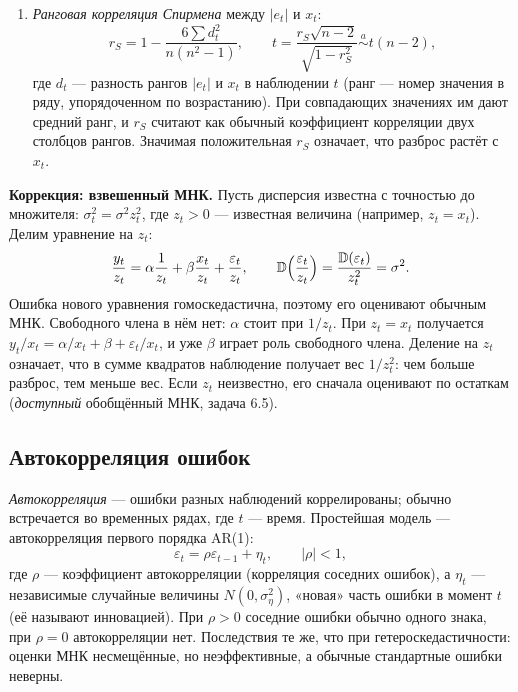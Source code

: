 \begin{enumerate}[label=\arabic*), leftmargin=2.2em, itemsep=4pt]
  \item \emph{Ранговая корреляция Спирмена} между $|e_t|$ и $x_t$:
        \begin{equation}
          r_S = 1 - \frac{6\sum d_t^2}{n(n^2 - 1)},
          \qquad
          t = \frac{r_S\sqrt{n-2}}{\sqrt{1 - r_S^2}} \overset{a}{\sim} t(n-2),
          \label{eq:spearman}
        \end{equation}
        где $d_t$ — разность рангов $|e_t|$ и $x_t$ в наблюдении $t$ (ранг —
        номер значения в ряду, упорядоченном по возрастанию). При совпадающих
        значениях им дают средний ранг, и $r_S$ считают как обычный
        коэффициент корреляции двух столбцов рангов. Значимая положительная
        $r_S$ означает, что разброс растёт с $x_t$.
\end{enumerate}

\textbf{Коррекция: взвешенный МНК.} Пусть дисперсия известна с точностью до
множителя: $\sigma_t^2 = \sigma^2z_t^2$, где $z_t > 0$ — известная величина
(например, $z_t = x_t$). Делим уравнение на $z_t$:
\begin{equation}
  \frac{y_t}{z_t} = \alpha\frac{1}{z_t} + \beta\frac{x_t}{z_t} + \frac{\varepsilon_t}{z_t},
  \qquad
  \mathbb{D}\Bigl(\frac{\varepsilon_t}{z_t}\Bigr) = \frac{\mathbb{D}(\varepsilon_t)}{z_t^2} = \sigma^2 .
  \label{eq:wls}
\end{equation}
Ошибка нового уравнения гомоскедастична, поэтому его оценивают обычным МНК.
Свободного члена в нём нет: $\alpha$ стоит при $1/z_t$. При $z_t = x_t$
получается $y_t/x_t = \alpha/x_t + \beta + \varepsilon_t/x_t$, и уже $\beta$
играет роль свободного члена. Деление на $z_t$ означает, что в сумме квадратов
наблюдение получает вес $1/z_t^2$: чем больше разброс, тем меньше вес. Если
$z_t$ неизвестно, его сначала оценивают по остаткам (\emph{доступный}
обобщённый МНК, задача 6.5).

\subsection{Автокорреляция ошибок}\label{sec:ac}

\emph{Автокорреляция} — ошибки разных наблюдений коррелированы; обычно
встречается во временных рядах, где $t$ — время. Простейшая модель —
автокорреляция первого порядка AR(1):
\[
  \varepsilon_t = \rho\varepsilon_{t-1} + \eta_t, \qquad |\rho| < 1,
\]
где $\rho$ — коэффициент автокорреляции (корреляция соседних ошибок), а
$\eta_t$ — независимые случайные величины $N(0, \sigma_\eta^2)$, «новая» часть
ошибки в момент $t$ (её называют инновацией). При $\rho > 0$ соседние ошибки
обычно одного знака, при $\rho = 0$ автокорреляции нет. Последствия те же, что
при гетероскедастичности: оценки МНК несмещённые, но неэффективные, а обычные
стандартные ошибки неверны.

